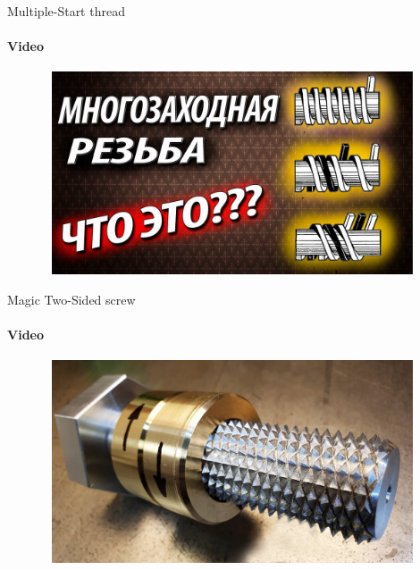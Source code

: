 \documentclass[aspectratio=169]{beamer}
\begin{document}
\begin{frame}[t]{Multiple-Start thread}
    \framesubtitle{Video}
    \vspace{-0.6cm}
    \begin{figure}[H]
        \href{https://youtu.be/MwIBrNMjMrw}{
            \centering\includegraphics[height=6cm,width=1\textwidth,keepaspectratio]{multitheding_video.jpg}}
        \label{fig:multitheding_video.jpg}
    \end{figure}
\end{frame}

\begin{frame}[t]{Magic Two-Sided screw}
    \framesubtitle{Video}
    \vspace{-0.6cm}
    \begin{figure}[H]
        \href{https://youtu.be/cDfMI5ahbJI?t=722}{
            \centering\includegraphics[height=6cm,width=1\textwidth,keepaspectratio]{two_sided_screw_video.jpg}}
        \label{fig:two_sided_screw_video.jpg}
    \end{figure}
\end{frame}
\end{document}
